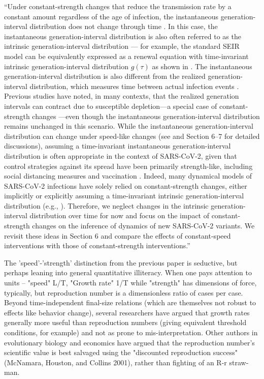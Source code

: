 \documentclass[12pt]{article}
\newcommand{\revtext}{\textsf}
\begin{document}
``Under constant-strength changes that reduce the transmission rate by a constant amount regardless of the age of infection, the instantaneous generation-interval distribution does not change through time \citep{fraser2007estimating}.
In this case, the instantaneous generation-interval distribution is also often referred to as the intrinsic generation-interval distribution \citep{champredon2015intrinsic,champredon2018two,gostic2020practical,park2020time}---
for example, the standard SEIR model can be equivalently expressed as a renewal equation with time-invariant intrinsic generation-interval distribution $g(\tau)$ as shown in \citep{champredon2018equivalence}.
The instantaneous generation-interval distribution is also different from the realized generation-interval distribution, which measures time between actual infection events \citep{champredon2015intrinsic}.
Previous studies have noted, in many contexts, that the realized generation intervals can contract due to susceptible depletion---a special case of constant-strength changes \citep{kenah2008generation,nishiura2010time,champredon2015intrinsic}---even though the instantaneous generation-interval distribution remains unchanged in this scenario.
While the instantaneous generation-interval distribution can change under speed-like changes (see \cite{fraser2007estimating} and Section 6--7 for detailed discussions), assuming a time-invariant instantaneous generation-interval distribution is often appropriate in the context of SARS-CoV-2, given that control strategies against its spread have been primarily strength-like, including social distancing measures \citep{flaxman2020Rt} and vaccination \citep{moore2021vaccination}.
Indeed, many dynamical models of SARS-CoV-2 infections have solely relied on constant-strength changes, either implicitly or explicitly assuming a time-invariant intrinsic generation-interval distribution (e.g., \citep{flaxman2020Rt,gostic2020practical,brauner2021inferring}).
Therefore, we neglect changes in the intrinsic generation-interval distribution over time for now and focus on the impact of constant-strength changes on the inference of dynamics of new SARS-CoV-2 variants.
We revisit these ideas in Section 6 and compare the effects of constant-speed interventions with those of constant-strength interventions.''

\revtext{The 'speed'-'strength' distinction from the previous paper is seductive, but perhaps leaning into general quantitative illiteracy.  When one pays attention to units -- "speed" L/T,  "Growth rate" 1/T while "strength" has dimensions of force, typically, but reproduction number is a dimensionless ratio of cases per case.  Beyond time-independent final-size relations (which are themselves not robust to effects like behavior change), several researchers have argued that growth rates generally more useful than reproduction numbers (giving equivalent threshold conditions, for example) and not as prone to mis-interpretation.  Other authors in evolutionary biology and economics have argued that the reproduction number's scientific value is best salvaged using the "discounted reproduction success" (McNamara, Houston, and Collins 2001), rather than fighting of an R-r straw-man.}
\end{document}

